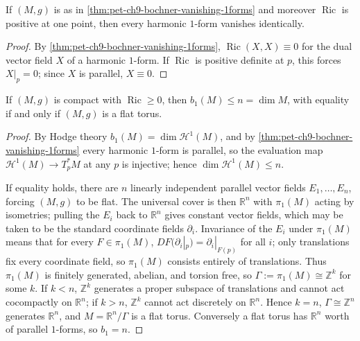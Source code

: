 \begin{corollary}[Corollary 9.2.4]
  \label{cor:pet-ch9-harmonic-1forms-vanish-positive-ricci}
  If $(M,g)$ is as in \cref{thm:pet-ch9-bochner-vanishing-1forms} and moreover
  $\operatorname{Ric}$ is positive at one point, then every harmonic $1$-form vanishes
  identically.
\end{corollary}
\begin{proof}
  By \cref{thm:pet-ch9-bochner-vanishing-1forms}, $\operatorname{Ric}(X,X)\equiv0$ for the
  dual vector field $X$ of a harmonic $1$-form. If $\operatorname{Ric}$ is positive
  definite at $p$, this forces $X|_p=0$; since $X$ is parallel, $X\equiv0$.
\end{proof}

\begin{corollary}[Corollary 9.2.5]
  \label{cor:pet-ch9-betti1-bound-flat-torus}
  If $(M,g)$ is compact with $\operatorname{Ric}\ge0$, then $b_1(M)\le n=\dim M$, with
  equality if and only if $(M,g)$ is a flat torus.
\end{corollary}
\begin{proof}
  By Hodge theory $b_1(M)=\dim\mathcal{H}^1(M)$, and by
  \cref{thm:pet-ch9-bochner-vanishing-1forms} every harmonic $1$-form is
  parallel, so the evaluation map $\mathcal{H}^1(M)\to T_p^*M$ at any $p$ is
  injective; hence $\dim\mathcal{H}^1(M)\le n$.

  If equality holds, there are $n$ linearly independent parallel vector fields
  $E_1,\dots,E_n$, forcing $(M,g)$ to be flat. The universal cover is then
  $\mathbb{R}^n$ with $\pi_1(M)$ acting by isometries; pulling the $E_i$ back to
  $\mathbb{R}^n$ gives constant vector fields, which may be taken to be the standard
  coordinate fields $\partial_i$. Invariance of the $E_i$ under $\pi_1(M)$ means
  that for every $F\in\pi_1(M)$, $DF(\partial_i|_p)=\partial_i|_{F(p)}$ for all $i$;
  only translations fix every coordinate field, so $\pi_1(M)$ consists entirely
  of translations. Thus $\pi_1(M)$ is finitely generated, abelian, and torsion
  free, so $\Gamma:=\pi_1(M)\cong\mathbb{Z}^k$ for some $k$. If $k<n$, $\mathbb{Z}^k$
  generates a proper subspace of translations and cannot act cocompactly on
  $\mathbb{R}^n$; if $k>n$, $\mathbb{Z}^k$ cannot act discretely on $\mathbb{R}^n$. Hence $k=n$,
  $\Gamma\cong\mathbb{Z}^n$ generates $\mathbb{R}^n$, and $M=\mathbb{R}^n/\Gamma$ is a flat torus.
  Conversely a flat torus has $\mathbb{R}^n$ worth of parallel $1$-forms, so
  $b_1=n$.
\end{proof}

